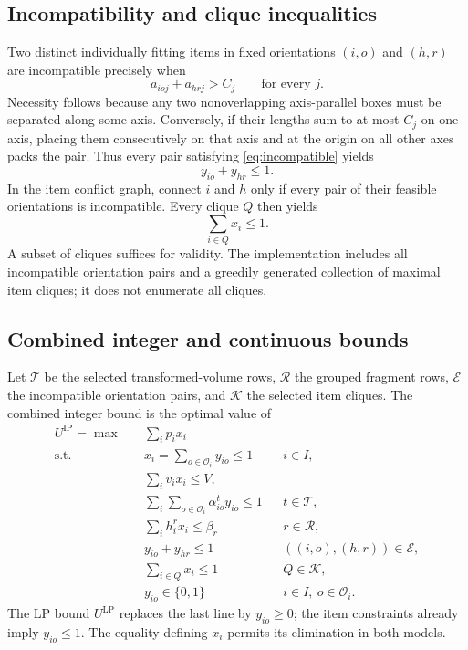 \subsection{Incompatibility and clique inequalities}
Two distinct individually fitting items in fixed orientations $(i,o)$
and $(h,r)$ are incompatible precisely when
\begin{equation}
 a_{ioj}+a_{hrj}>C_j\qquad\text{for every }j.                    \label{eq:incompatible}
\end{equation}
Necessity follows because any two nonoverlapping axis-parallel boxes
must be separated along some axis. Conversely, if their lengths sum
to at most $C_j$ on one axis, placing them consecutively on that axis
and at the origin on all other axes packs the pair. Thus every pair
satisfying \eqref{eq:incompatible} yields
\begin{equation}
 y_{io}+y_{hr}\leq1.                                           \label{eq:pair-cut}
\end{equation}
In the item conflict graph, connect $i$ and $h$ only if every pair
of their feasible orientations is incompatible. Every clique $Q$
then yields
\begin{equation}
 \sum_{i\in Q}x_i\leq1.                                       \label{eq:item-clique}
\end{equation}
A subset of cliques suffices for validity. The implementation includes
all incompatible orientation pairs and a greedily generated collection
of maximal item cliques; it does not enumerate all cliques.

\subsection{Combined integer and continuous bounds}
Let $\mathcal T$ be the selected transformed-volume rows,
$\mathcal R$ the grouped fragment rows, $\mathcal E$ the incompatible
orientation pairs, and $\mathcal K$ the selected item cliques. The
combined integer bound is the optimal value of
\begin{subequations}\label{eq:combined}
\begin{align}
 U^{\mathrm{IP}}=\max\quad&\sum_i p_i x_i                       \label{eq:obj}\\
 \text{s.t.}\quad
 &x_i=\sum_{o\in\mathcal O_i}y_{io}\leq1 && i\in I,\\
 &\sum_i v_i x_i\leq V,\\
 &\sum_i\sum_{o\in\mathcal O_i}\alpha^t_{io}y_{io}\leq1
                                      &&t\in\mathcal T,\\
 &\sum_i h_i^r x_i\leq\beta_r &&r\in\mathcal R,\\
 &y_{io}+y_{hr}\leq1 &&((i,o),(h,r))\in\mathcal E,\\
 &\sum_{i\in Q}x_i\leq1 &&Q\in\mathcal K,\\
 &y_{io}\in\{0,1\} &&i\in I,\ o\in\mathcal O_i.
\end{align}
\end{subequations}
The LP bound $U^{\mathrm{LP}}$ replaces the last line by $y_{io}\geq0$;
the item constraints already imply $y_{io}\leq1$. The equality defining
$x_i$ permits its elimination in both models.

